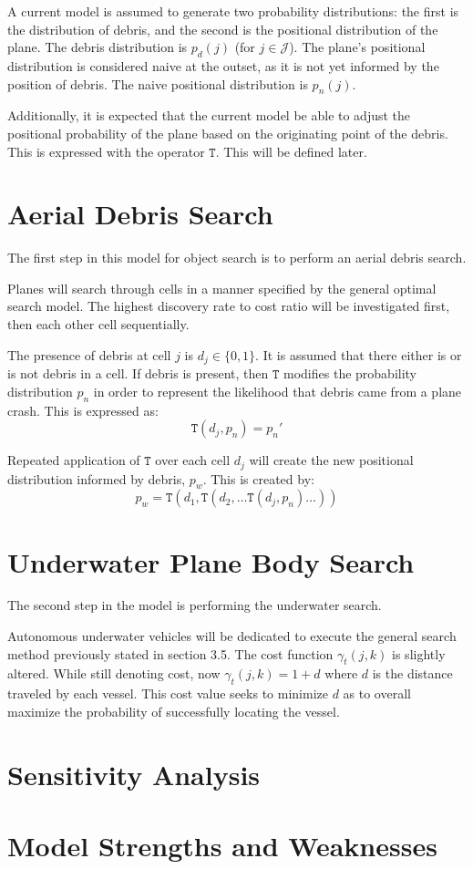 \documentclass[a4paper]{article}
\begin{document}
A current model is assumed to generate two probability distributions: the first is the distribution of debris, and the second is the positional distribution of the plane. The debris distribution is $p_d(j)$ (for $j\in\mathcal{J}$). The plane's positional distribution is considered naive at the outset, as it is not yet informed by the position of debris. The naive positional distribution is $p_n(j)$. 

Additionally, it is expected that the current model be able to adjust the positional probability of the plane based on the originating point of the debris. This is expressed with the operator $\mathtt{T}$. This will be defined later. 

\section{Aerial Debris Search}

The first step in this model for object search is to perform an aerial debris search. 

Planes will search through cells in a manner specified by the general optimal search model. The highest discovery rate to cost ratio will be investigated first, then each other cell sequentially.

The presence of debris at cell $j$ is $d_j\in \{0,1\}$. It is assumed that there either is or is not debris in a cell. If debris is present, then $\mathtt{T}$ modifies the probability distribution $p_n$ in order to represent the likelihood that debris came from a plane crash. This is expressed as: $$\mathtt{T}(d_j,p_n)=p_n'$$

Repeated application of $\mathtt{T}$ over each cell $d_j$ will create the new positional distribution informed by debris, $p_w$. This is created by: $$p_w=\mathtt{T}(d_1, \mathtt{T}(d_2, \ldots \mathtt{T}(d_j, p_n)\ldots))$$

\section{Underwater Plane Body Search}
The second step in the model is performing the underwater search. 

Autonomous underwater vehicles will be dedicated to execute the general search method previously stated in section 3.5. The cost function $\gamma_t(j,k)$ is slightly altered. While still denoting cost, now $\gamma_t(j,k)=1+d$ where $d$ is the distance traveled by each vessel. This cost value seeks to minimize $d$ as to overall maximize the probability of successfully locating the vessel.


\section{Sensitivity Analysis}




\section{Model Strengths and Weaknesses}



    
\end{document}

